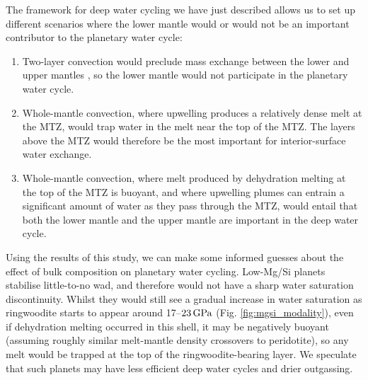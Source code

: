\documentclass[fleqn,usenatbib]{mnras}
\newcommand{\todo}[1]{\textit{\textcolor{violet}{{#1}}}}
\begin{document}
The framework for deep water cycling we have just described allows us to set up different scenarios where the lower mantle would or would not be an important contributor to the planetary water cycle: %
\begin{enumerate}
    \item Two-layer convection would preclude mass exchange between the lower and upper mantles \citep[e.g.,][]{tackley_mantle_1995}, so the lower mantle would not participate in the planetary water cycle.
    \item Whole-mantle convection, where upwelling produces a relatively dense melt at the MTZ, would trap water in the melt near the top of the MTZ. The layers above the MTZ would therefore be the most important for interior-surface water exchange.
    \item Whole-mantle convection, where melt produced by dehydration melting at the top of the MTZ is buoyant, and where upwelling plumes can entrain a significant amount of water as they pass through the MTZ, would entail that both the lower mantle and the upper mantle are important in the deep water cycle.
\end{enumerate}


Using the results of this study, we can make some informed guesses about the effect of bulk composition on planetary water cycling. Low-Mg/Si planets stabilise little-to-no wad, and therefore would not have a sharp water saturation discontinuity. Whilst they would still see a gradual increase in water saturation as ringwoodite starts to appear around 17--$23\,{\rm GPa}$ (Fig. \ref{fig:mgsi_modality}), even if dehydration melting occurred in this shell, it may be negatively buoyant (assuming roughly similar melt-mantle density crossovers to peridotite), so any melt would be trapped at the top of the ringwoodite-bearing layer. We speculate that such planets may have less efficient deep water cycles and drier outgassing. 


\end{document}
